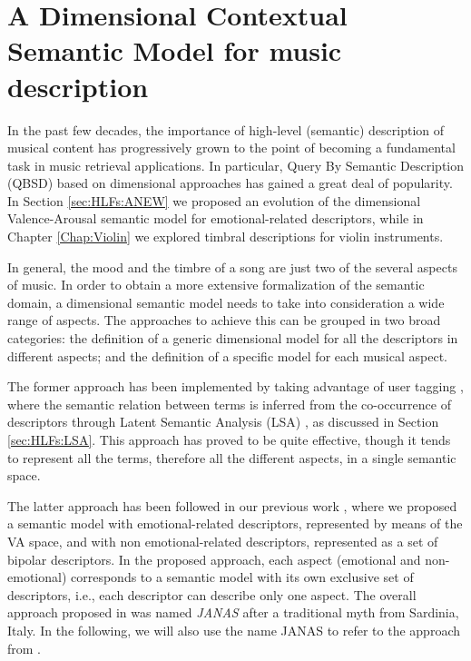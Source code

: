\chapter{A Dimensional Contextual Semantic Model for music description}
\label{Chap:DCSM}
In the past few decades, the importance of high-level (semantic) description of musical content has progressively grown to the point of becoming a fundamental task in music retrieval applications. In particular, Query By Semantic Description (QBSD) \cite{Turnbull2007,Zanoni2012,Buccoli2013} based on dimensional approaches has gained a great deal of popularity. %
In Section \ref{sec:HLFs:ANEW} we proposed an evolution of the dimensional Valence-Arousal semantic model for emotional-related descriptors, while in Chapter \ref{Chap:Violin} we explored timbral descriptions for violin instruments. %

In general, the mood and the timbre of a song are just two of the several aspects of music. In order to obtain a more extensive formalization of the semantic domain, a dimensional semantic model needs to take into consideration a wide range of aspects. The approaches to achieve this can be grouped in two broad categories: the definition of a generic dimensional model for all the descriptors in different aspects; and the definition of a specific model for each musical aspect.

The former approach has been implemented by taking advantage of user tagging \cite{lamere2009, Barrington2009}, where the semantic relation between terms is inferred from the co-occurrence of descriptors \cite{Levy2007, Sordo2010, Laurier2009} through Latent Semantic Analysis (LSA) \cite{Deerwester1990}, as discussed in Section \ref{sec:HLFs:LSA}. This approach has proved to be quite effective, though it tends to represent all the terms, therefore all the different aspects, in a single semantic space. 

The latter approach has been followed in our previous work \cite{Buccoli2013}, where we proposed a semantic model with emotional-related descriptors, represented by means of the VA space, and with non emotional-related descriptors, represented as a set of bipolar descriptors. In the proposed approach, each aspect (emotional and non-emotional) corresponds to a semantic model with its own exclusive set of descriptors, i.e., each descriptor can describe only one aspect. The overall approach proposed in \cite{Buccoli2013} was named \textit{JANAS} after a traditional myth from Sardinia, Italy. In the following, we will also use the name JANAS to refer to the approach from \cite{Buccoli2013}.  

